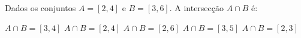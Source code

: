 Dados os conjuntos $A=[2,4]$ e $B=[3,6]$. A intersecção $A\cap B$ é:

$A\cap B=[3,4]$
$A\cap B=[2,4]$
$A\cap B=[2,6]$
$A\cap B=[3,5]$
$A\cap B=[2,3]$

